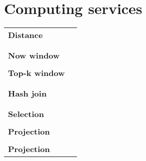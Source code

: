	\section{Computing services} \label{appendix.schema.computingServices}
	{\footnotesize
		\begin{tabular}{p{3cm}l}
			\textbf{Distance} & \begin{minipage}[t]{0.85\textwidth}
						\googlemapsDistance
					\end{minipage} \\
		     \\	\hline
		     \\ \textbf{Now window} & \begin{minipage}[t]{0.85\textwidth}
						\Now
					\end{minipage} \\
			\hline
		     \\ \textbf{Top-k window} & \begin{minipage}[t]{0.85\textwidth}
						\TopK
					\end{minipage} \\
		     \\	\hline
		     \\ \textbf{Hash join} & \begin{minipage}[t]{0.85\textwidth}
						\HashJoin
					\end{minipage} \\
		     \\	\hline
		     \\ \textbf{Selection} & \begin{minipage}[t]{0.85\textwidth}
						\Selection
					\end{minipage} \\
			\hline
		     \\ \textbf{Projection} & \begin{minipage}[t]{0.85\textwidth}
						\Projection
					\end{minipage} \\
			\hline
		     \\ \textbf{Projection} & \begin{minipage}[t]{0.85\textwidth}
						\Rename
					\end{minipage} \\
		\end{tabular}
	}
